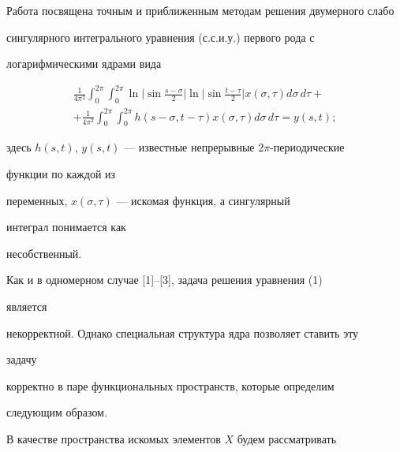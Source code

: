  




\maketitle 


\label{begin} 


 


Работа посвящена точным и приближенным методам решения двумерного слабо 


сингулярного интегрального уравнения (с.с.и.у.) первого рода с 


логарифмическими ядрами вида 


\begin{multline} 


\frac{1}{4\pi^2}\int^{2\pi}_0\int^{2\pi}_0\ln\bigg|\sin 


\frac{s-\sigma}{2}\bigg|\ln\bigg|\sin\frac{t-\tau}{2}\bigg| 


x(\sigma,\tau)d\sigma\,d\tau+\\ 


% 


+\frac{1}{4\pi^2}\int^{2\pi}_0\int^{2\pi}_0 


h(s-\sigma,t-\tau)x(\sigma,\tau)d\sigma\,d\tau=y(s,t); 


\end{multline} 


здесь $h(s,t)$, $y(s,t)$ --- известные непрерывные $2\pi$-периодические 


функции по каждой из 


переменных, $x(\sigma,\tau)$ --- искомая функция, а сингулярный 


интеграл понимается как 


несобственный. 


 


Как и в одномерном случае [1]--[3], задача решения уравнения (1) 


является 


некорректной. Однако специальная структура ядра позволяет ставить эту 


задачу 


корректно в паре функциональных пространств, которые определим 


следующим образом. 


В качестве пространства искомых элементов $X$ будем рассматривать 



